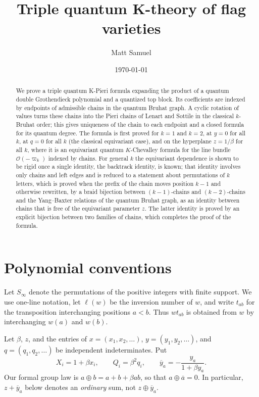\documentclass[11pt]{article}
\title{Triple quantum K-theory of flag varieties}
\author{Matt Samuel}
\date{\today}
\newcommand{\ellength}{\ell}
\begin{document}
\maketitle

\begin{abstract}
We prove a triple quantum K-Pieri formula expanding the product of a
quantum double Grothendieck polynomial and a quantized top block. Its
coefficients are indexed by endpoints of admissible chains in the
quantum Bruhat graph. A cyclic rotation of values turns these chains
into the Pieri chains of Lenart and Sottile in the classical
$k$-Bruhat order; this gives uniqueness of the chain to each endpoint
and a closed formula for its quantum degree. The formula is first
proved for $k=1$ and $k=2$, at $y=0$ for all $k$, at $q=0$ for all
$k$ (the classical equivariant case), and on the hyperplane
$z=1/\beta$ for all $k$, where it is an equivariant quantum
$K$-Chevalley formula for the line bundle $\mathcal O(-\varpi_k)$
indexed by chains. For general $k$ the equivariant dependence is shown
to be rigid once a single identity, the backtrack identity, is known;
that identity involves only chains and left edges and is reduced to a
statement about permutations of $k$ letters, which is proved when the
prefix of the chain moves position $k-1$ and otherwise rewritten, by a
braid bijection between $(k-1)$-chains and $(k-2)$-chains and the
Yang--Baxter relations of the quantum Bruhat graph, as an identity
between chains that is free of the equivariant parameter $z$. The
latter identity is proved by an explicit bijection between two
families of chains, which completes the proof of the formula.
\end{abstract}

\section{Polynomial conventions}

Let $S_\infty$ denote the permutations of the positive integers with
finite support. We use one-line notation, let $\ellength(w)$ be the
inversion number of $w$, and write $t_{ab}$ for the transposition
interchanging positions $a<b$. Thus $wt_{ab}$ is obtained from $w$
by interchanging $w(a)$ and $w(b)$.

Let $\beta$, $z$, and the entries of $x=(x_1,x_2,\ldots)$,
$y=(y_1,y_2,\ldots)$, and $q=(q_1,q_2,\ldots)$ be independent
indeterminates. Put
\[
 X_i=1+\beta x_i,\qquad Q_i=\beta^2q_i,\qquad
 \overline y_a=-\frac{y_a}{1+\beta y_a}.
\]
Our formal group law is $a\oplus b=a+b+\beta ab$, so that
$a\oplus\overline a=0$. In particular,
$z+\overline y_a$ below denotes an \emph{ordinary} sum, not
$z\oplus\overline y_a$.
\end{document}
